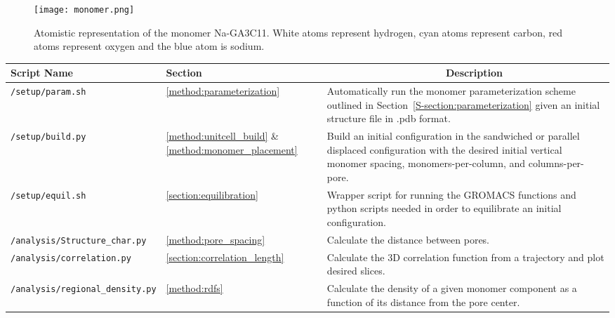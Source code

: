   \begin{figure}[!htb]
	\centering
        \texttt{[image: monomer.png]}
	\caption{Atomistic representation of the monomer Na-GA3C11. White atoms
		represent hydrogen, cyan atoms represent carbon, red atoms represent oxygen and
		the blue atom is sodium.}\label{S-fig:monomer}
  \end{figure}
  
  \clearpage

  \begin{table}[htb!]
  \centering
  \begin{tabular}{|A|B|C|}
  \hline
  \textbf{Script Name} & \textbf{Section} & ~~~~~~~~~~~~~~~~~~~~~\textbf{Description} \\
  \hline
  \texttt{/setup/param.sh} & \ref{method:parameterization} & Automatically run the monomer
  parameterization scheme outlined in Section~\ref{S-section:parameterization} given an initial
  structure file in .pdb format. \\ \hline
  
  \texttt{/setup/build.py} & \ref{method:unitcell_build} \& \ref{method:monomer_placement} &
  Build an initial configuration in the sandwiched or parallel displaced configuration with the 
  desired initial vertical monomer spacing, monomers-per-column, and columns-per-pore. \\ \hline
  
  \texttt{/setup/equil.sh} & \ref{section:equilibration} & Wrapper script for running the GROMACS 
  functions and python scripts needed in order to equilibrate an initial configuration. \\ \hline
   
  \texttt{/analysis/Structure\_char.py} & \ref{method:pore_spacing} & Calculate the distance 
  between pores. \\ \hline
  
  \texttt{/analysis/correlation.py} & \ref{section:correlation_length} & Calculate the 3D 
  correlation function from a trajectory and plot desired slices. \\ \hline
  
  \texttt{/analysis/regional\_density.py} & \ref{method:rdfs} & Calculate the density of a given
  monomer component as a function of its distance from the pore center. \\ \hline
  

\end{tabular}
\end{table}
